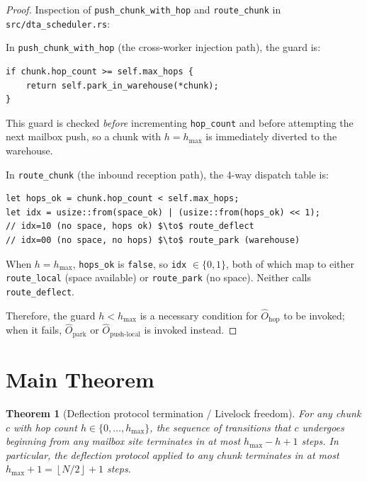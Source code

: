 \documentclass[11pt,a4paper]{article}
\newtheorem{theorem}{Theorem}[section]
\newcommand{\floor}[1]{\left\lfloor #1 \right\rfloor}
\newcommand{\code}[1]{\texttt{#1}}
\begin{document}
\begin{proof}
Inspection of \code{push\_chunk\_with\_hop} and \code{route\_chunk}
in \texttt{src/dta\_scheduler.rs}:

In \code{push\_chunk\_with\_hop} (the cross-worker injection path),
the guard is:
\begin{verbatim}
if chunk.hop_count >= self.max_hops {
    return self.park_in_warehouse(*chunk);
}
\end{verbatim}
This guard is checked \emph{before} incrementing \code{hop\_count}
and before attempting the next mailbox push, so a chunk with
$h = h_{\max}$ is immediately diverted to the warehouse.

In \code{route\_chunk} (the inbound reception path), the 4-way
dispatch table is:
\begin{verbatim}
let hops_ok = chunk.hop_count < self.max_hops;
let idx = usize::from(space_ok) | (usize::from(hops_ok) << 1);
// idx=10 (no space, hops ok) $\to$ route_deflect
// idx=00 (no space, no hops) $\to$ route_park (warehouse)
\end{verbatim}
When $h = h_{\max}$, \code{hops\_ok} is \code{false}, so
\code{idx} $\in \{0, 1\}$, both of which map to either
\code{route\_local} (space available) or \code{route\_park} (no
space).  Neither calls \code{route\_deflect}.

Therefore, the guard $h < h_{\max}$ is a necessary condition for
$\hat{O}_{\text{hop}}$ to be invoked; when it fails, $\hat{O}_{\text{park}}$
or $\hat{O}_{\text{push-local}}$ is invoked instead.
\end{proof}

\section{Main Theorem}

\begin{theorem}[Deflection protocol termination / Livelock freedom]
\label{thm:livelock}
For any chunk $c$ with hop count $h \in \{0, \ldots, h_{\max}\}$,
the sequence of transitions that $c$ undergoes beginning from any
mailbox site terminates in at most $h_{\max} - h + 1$ steps.
In particular, the deflection protocol applied to any chunk
terminates in at most $h_{\max} + 1 = \floor{N/2} + 1$ steps.
\end{theorem}
\end{document}
